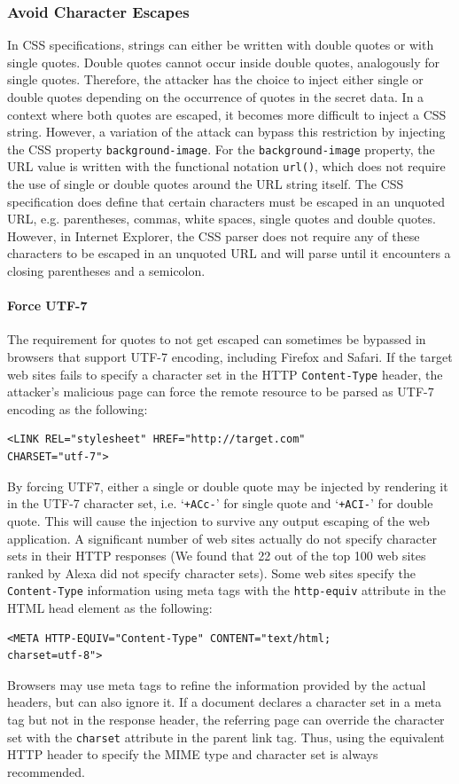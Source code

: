 \documentclass{acm_proc_article-sp}
\begin{document}
{\subsubsection{Avoid Character Escapes}
In CSS specifications\cite{css}, strings can either be written with double quotes or with single quotes. Double quotes cannot occur inside double quotes, analogously for single quotes. Therefore, the attacker has the choice to inject either single or double quotes depending on the occurrence of quotes in the secret data. In a context where both quotes are escaped, it becomes more difficult to inject a CSS string. However, a variation of the attack  can bypass this restriction by injecting the CSS property \texttt{background-image}. For the \texttt{background-image} property, the URL value is written with the functional notation \texttt{url()}, which does not require the use of single or double quotes around the URL string itself. The CSS specification does define that certain characters must be escaped in an unquoted URL, e.g. parentheses, commas, white spaces, single quotes and double quotes. However, in Internet Explorer, the CSS parser does not require any of these characters to be escaped in an unquoted URL and will parse until it encounters a closing parentheses and a semicolon.

\paragraph{Force UTF-7}
The requirement for quotes to not get escaped can sometimes be bypassed in browsers that support UTF-7 encoding, including Firefox and Safari. If the target web sites fails to specify a character set in the HTTP \texttt{Content-Type} header, the attacker's malicious page can force the remote resource to be parsed as UTF-7 encoding as the following:
\begin{verbatim}
<LINK REL="stylesheet" HREF="http://target.com" 
CHARSET="utf-7">
\end{verbatim}
By forcing UTF7, either a single or double quote may be injected by rendering it in the UTF-7 character set, i.e. `\texttt{+ACc-}' for single quote and `\texttt{+ACI-}' for double quote. This will cause the injection to survive any output escaping of the web application. A significant number of web sites actually do not specify character sets in their HTTP responses (We found that 22 out of the top 100 web sites ranked by Alexa\cite{alexa} did not specify character sets). Some web sites specify the \texttt{Content-Type} information using meta tags with the \texttt{http-equiv} attribute in the HTML head element as the following:
\begin{verbatim}
<META HTTP-EQUIV="Content-Type" CONTENT="text/html; 
charset=utf-8">
\end{verbatim}
Browsers may use meta tags to refine the information provided by the actual headers, but can also ignore it. If a document declares a character set in a meta tag but not in the response header, the referring page can override the character set with the \texttt{charset} attribute in the parent link tag. Thus, using the equivalent HTTP header to specify the MIME type and character set is always recommended.

}
\end{document}
